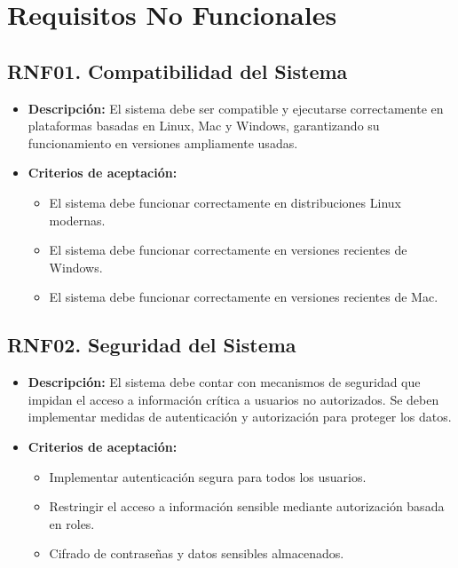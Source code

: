 \section{Requisitos No Funcionales}
	\subsection*{RNF01. Compatibilidad del Sistema}
		\begin{itemize}
			\item \textbf{Descripción:} El sistema debe ser compatible y ejecutarse correctamente en plataformas basadas en Linux, Mac y Windows, garantizando su funcionamiento en versiones ampliamente usadas.
			\item \textbf{Criterios de aceptación:}
			\begin{itemize}
				\item El sistema debe funcionar correctamente en distribuciones Linux modernas.
				\item El sistema debe funcionar correctamente en versiones recientes de Windows.
				\item El sistema debe funcionar correctamente en versiones recientes de Mac.
			\end{itemize}
		\end{itemize}
	
	\subsection*{RNF02. Seguridad del Sistema}
		\begin{itemize}
			\item \textbf{Descripción:} El sistema debe contar con mecanismos de seguridad que impidan el acceso a información crítica a usuarios no autorizados. Se deben implementar medidas de autenticación y autorización para proteger los datos.
			\item \textbf{Criterios de aceptación:}
			\begin{itemize}
				\item Implementar autenticación segura para todos los usuarios.
				\item Restringir el acceso a información sensible mediante autorización basada en roles.
				\item Cifrado de contraseñas y datos sensibles almacenados.
			\end{itemize}
		\end{itemize}
	
